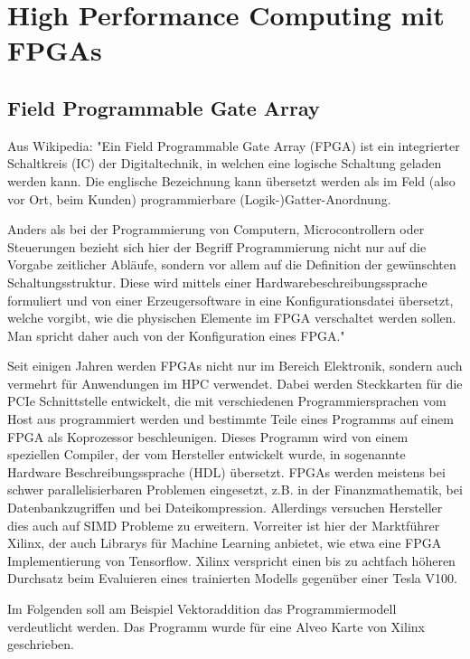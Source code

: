	\chapter{High Performance Computing mit FPGAs}
		\section{Field Programmable Gate Array}
		Aus Wikipedia:
		"Ein Field Programmable Gate Array (FPGA) ist ein integrierter Schaltkreis (IC) der Digitaltechnik, in welchen eine logische Schaltung geladen werden kann. Die englische Bezeichnung kann übersetzt werden als im Feld (also vor Ort, beim Kunden) programmierbare (Logik-)Gatter-Anordnung.

		Anders als bei der Programmierung von Computern, Microcontrollern oder Steuerungen bezieht sich hier der Begriff Programmierung nicht nur auf die Vorgabe zeitlicher Abläufe, sondern vor allem auf die Definition der gewünschten Schaltungsstruktur. Diese wird mittels einer Hardwarebeschreibungssprache formuliert und von einer Erzeugersoftware in eine Konfigurationsdatei übersetzt, welche vorgibt, wie die physischen Elemente im FPGA verschaltet werden sollen. Man spricht daher auch von der Konfiguration eines FPGA."

		Seit einigen Jahren werden FPGAs nicht nur im Bereich Elektronik, sondern auch vermehrt für Anwendungen im HPC verwendet. Dabei werden Steckkarten für die PCIe Schnittstelle entwickelt, die mit verschiedenen Programmiersprachen vom Host aus programmiert werden und bestimmte Teile eines Programms auf einem FPGA als Koprozessor beschleunigen. Dieses Programm wird von einem speziellen Compiler, der vom Hersteller entwickelt wurde, in sogenannte Hardware Beschreibungssprache (HDL) übersetzt. FPGAs werden meistens bei schwer parallelisierbaren Problemen eingesetzt, z.B. in der Finanzmathematik, bei Datenbankzugriffen und bei Dateikompression. Allerdings versuchen Hersteller dies auch auf SIMD Probleme zu erweitern. Vorreiter ist hier der Marktführer Xilinx, der auch Librarys für Machine Learning anbietet, wie etwa eine FPGA Implementierung von Tensorflow. Xilinx verspricht einen bis zu achtfach höheren Durchsatz beim Evaluieren eines trainierten Modells gegenüber einer Tesla V100.
		
		Im Folgenden soll am Beispiel Vektoraddition das Programmiermodell verdeutlicht werden. Das Programm wurde für eine Alveo Karte von Xilinx geschrieben.

